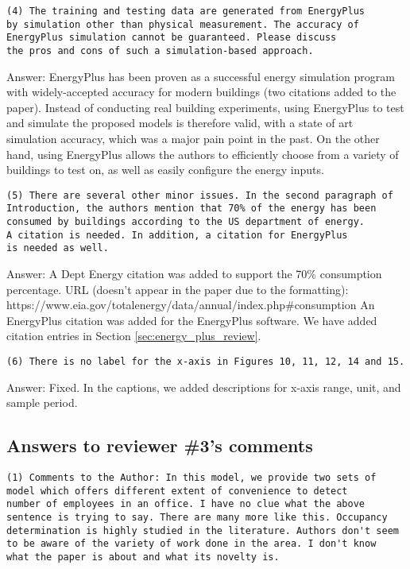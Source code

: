 \begin{verbatim}
(4) The training and testing data are generated from EnergyPlus
by simulation other than physical measurement. The accuracy of
EnergyPlus simulation cannot be guaranteed. Please discuss
the pros and cons of such a simulation-based approach.
\end{verbatim}

Answer: EnergyPlus has been proven as a successful energy simulation program with
widely-accepted accuracy for modern buildings (two citations added to the
paper).  Instead of conducting real building experiments, using EnergyPlus to
test and simulate the proposed models is therefore valid, with a state of art
simulation accuracy, which was a major pain point in the past. On the other
hand, using EnergyPlus allows the authors to efficiently choose from a variety
of buildings to test on, as well as easily configure the energy inputs.

\begin{verbatim}
(5) There are several other minor issues. In the second paragraph of
Introduction, the authors mention that 70% of the energy has been
consumed by buildings according to the US department of energy.
A citation is needed. In addition, a citation for EnergyPlus
is needed as well.
\end{verbatim}

Answer: A Dept Energy citation was added to support the 70\% consumption
percentage.  URL (doesn't appear in the paper due to the formatting):
https://www.eia.gov/totalenergy/data/annual/index.php\#consumption An
EnergyPlus citation was added for the EnergyPlus software. We have added
citation entries in Section \ref{sec:energy_plus_review}.

\begin{verbatim}
(6) There is no label for the x-axis in Figures 10, 11, 12, 14 and 15.
\end{verbatim}

Answer: Fixed. In the captions, we added descriptions for x-axis range, unit, and
sample period.

\subsection{Answers to reviewer \#3's comments}
\begin{verbatim}
(1) Comments to the Author: In this model, we provide two sets of
model which offers different extent of convenience to detect
number of employees in an office. I have no clue what the above
sentence is trying to say. There are many more like this. Occupancy
determination is highly studied in the literature. Authors don't seem
to be aware of the variety of work done in the area. I don't know
what the paper is about and what its novelty is.
\end{verbatim}

